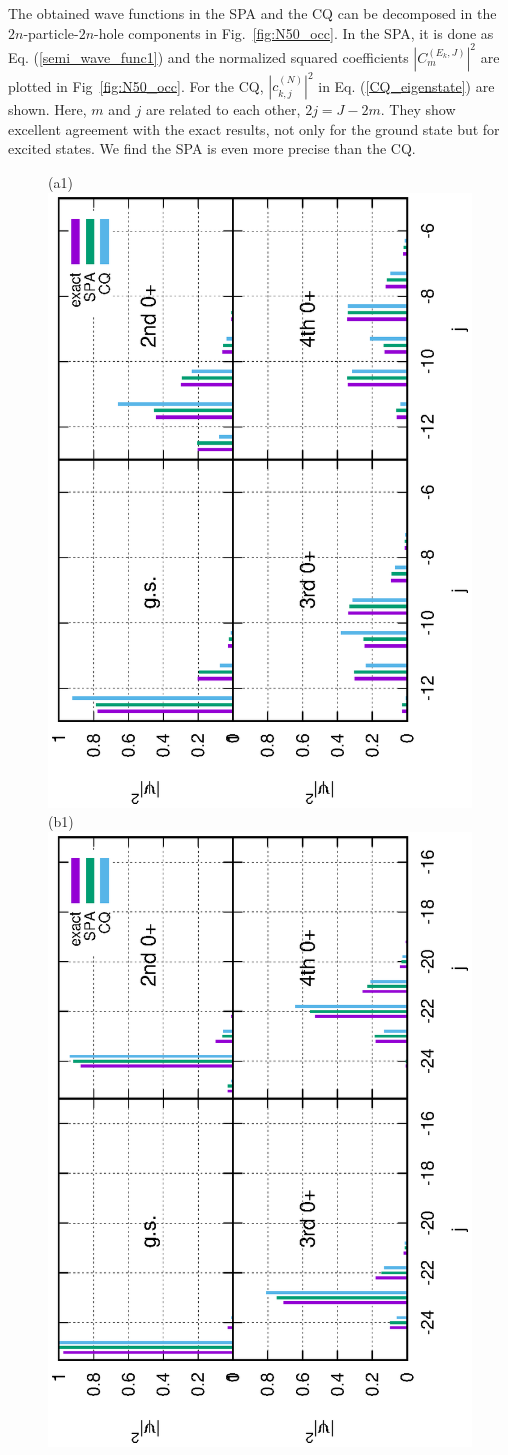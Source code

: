 \documentclass[%
superscriptaddress,
preprint,
showpacs,
nofootinbib,
amsmath,amssymb,
aps,
prc,
floatfix ]%
{revtex4-1}
\begin{document}
The obtained wave functions in the SPA and the CQ can be decomposed in the
$2n$-particle-$2n$-hole components in Fig.~\ref{fig:N50_occ}.
In the SPA, it is done as Eq. (\ref{semi_wave_func1}) and
the normalized squared coefficients $|C_m^{(E_k,J)}|^2$ are plotted
in Fig~\ref{fig:N50_occ}.
For the CQ, $|c_{k,j}^{(N)}|^2$ in Eq. (\ref{CQ_eigenstate}) are shown.
Here, $m$ and $j$ are related to each other, $2j=J-2m$.
They show excellent agreement with the exact results, not only for the
ground state but for excited states.
We find the SPA is even more precise than the CQ.
\begin{figure}[t]
 \begin{minipage}{1\hsize}
 \begin{center}
(a1)\includegraphics[height=0.45\textwidth,angle=-90]{images/N50Xeq0p5occ_wo_adiabatic.eps}
(b1)\includegraphics[height=0.45\textwidth,angle=-90]{images/N100Xeq0p5occ_wo_adiabatic.eps}
 \end{center}
 \end{minipage}
 \begin{minipage}{1\hsize}
 \begin{center}

\end{center}
\end{minipage}
\end{figure}
\end{document}
